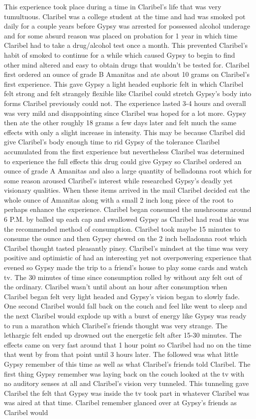 \documentclass[12pt]{book}
\begin{document}
This experience took place during a time in Claribel's life that was very tumultuous. Claribel was a college student at the time and had was smoked pot daily for a couple years before Gypsy was arrested for possessed alcohol underage and for some absurd reason was placed on probation for 1 year in which time Claribel had to take a drug/alcohol test once a month. This prevented Claribel's habit of smoked to continue for a while which caused Gypsy to begin to find other mind altered and easy to obtain drugs that wouldn't be tested for. Claribel first ordered an ounce of grade B Amanitas and ate about 10 grams on Claribel's first experience. This gave Gypsy a light headed euphoric felt in which Claribel felt strong and felt strangely flexible like Claribel could stretch Gypsy's body into forms Claribel previously could not. The experience lasted 3-4 hours and overall was very mild and disappointing since Claribel was hoped for a lot more. Gypsy then ate the other roughly 18 grams a few days later and felt much the same effects with only a slight increase in intensity. This may be because Claribel did give Claribel's body enough time to rid Gypsy of the tolerance Claribel accumulated from the first experience but nevertheless Claribel was determined to experience the full effects this drug could give Gypsy so Claribel ordered an ounce of grade A Amanitas and also a large quantity of belladonna root which for some reason aroused Claribel's interest while researched Gypsy's deadly yet visionary qualities. When these items arrived in the mail Claribel decided eat the whole ounce of Amanitas along with a small 2 inch long piece of the root to perhaps enhance the experience. Claribel began consumed the mushrooms around 6 P.M. by balled up each cap and swallowed Gypsy as Claribel had read this was the recommended method of consumption. Claribel took maybe 15 minutes to consume the ounce and then Gypsy chewed on the 2 inch belladonna root which Claribel thought tasted pleasantly piney. Claribel's mindset at the time was very positive and optimistic of had an interesting yet not overpowering experience that evened so Gypsy made the trip to a friend's house to play some cards and watch tv. The 30 minutes of time since consumption rolled by without any felt out of the ordinary. Claribel wasn't until about an hour after consumption when Claribel began felt very light headed and Gypsy's vision began to slowly fade. One second Claribel would fall back on the couch and feel like went to sleep and the next Claribel would explode up with a burst of energy like Gypsy was ready to run a marathon which Claribel's friends thought was very strange. The lethargic felt ended up drowned out the energetic felt after 15-30 minutes. The effects came on very fast around that 1 hour point so Claribel had no  on the time that went by from that point until 3 hours later. The followed was what little Gypsy remember of this time as well as what Claribel's friends told Claribel. The first thing Gypsy remember was laying back on the couch looked at the tv with no auditory senses at all and Claribel's vision very tunneled. This tunneling gave Claribel the felt that Gypsy was inside the tv took part in whatever Claribel was was aired at that time. Claribel remember glanced over at Gypsy's friends as Claribel would 
\end{document}
